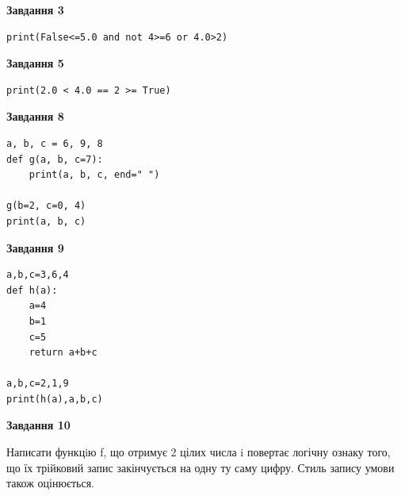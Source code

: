 \documentclass[12pt, ukrainian]{article}
\begin{document}
{\begin {large}
\begin{minipage}[t]{7.5cm}
\end{minipage}
\vline \hspace{6mm}
\begin{minipage}[t]{10.5cm}

\begin{center}
\textbf{Завдання 3}
\end{center}

\begin{verbatim}
print(False<=5.0 and not 4>=6 or 4.0>2)
\end{verbatim}



\begin{center}
\textbf{Завдання 5}
\end{center}

\begin{verbatim}
print(2.0 < 4.0 == 2 >= True)
\end{verbatim}



\begin{center}
\textbf{Завдання 8}
\end{center}

\begin{verbatim}
a, b, c = 6, 9, 8
def g(a, b, c=7):
    print(a, b, c, end=" ")

g(b=2, c=0, 4)
print(a, b, c)
\end{verbatim}



\begin{center}
\textbf{Завдання 9}
\end{center}

\begin{verbatim}
a,b,c=3,6,4
def h(a):
    a=4
    b=1
    c=5
    return a+b+c

a,b,c=2,1,9
print(h(a),a,b,c)
\end{verbatim}



\begin{center}
\textbf{Завдання 10}
\end{center}

Написати функцiю f, що отримує 2 цілих числа i повертає логічну ознаку того, що їх трійковий запис закінчується на одну ту саму цифру. Стиль запису умови також оцінюється.\par

\end{minipage}

\end {large}}
\newpage
\end{document}
